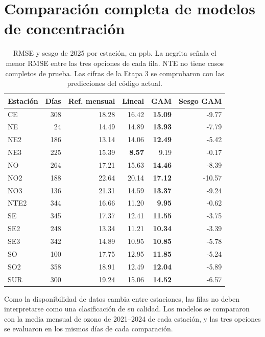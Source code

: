\documentclass[11pt,letterpaper]{article}
\begin{document}
\section{Comparación completa de modelos de concentración}\label{anexo:modelos}
\begin{table}[!htbp]\centering\small
\begin{tabular}{@{}lrrrrr@{}}
\toprule
Estación & Días & Ref. mensual & Lineal & GAM & Sesgo GAM \\
\midrule
CE & 308 & 18.28 & 16.42 & \textbf{15.09} & -9.77 \\
NE & 24 & 14.49 & 14.89 & \textbf{13.93} & -7.79 \\
NE2 & 186 & 13.14 & 14.06 & \textbf{12.49} & -5.42 \\
NE3 & 225 & 15.39 & \textbf{8.57} & 9.19 & -0.17 \\
NO & 264 & 17.21 & 15.63 & \textbf{14.46} & -8.39 \\
NO2 & 188 & 22.64 & 20.14 & \textbf{17.12} & -10.57 \\
NO3 & 136 & 21.31 & 14.59 & \textbf{13.37} & -9.24 \\
NTE2 & 344 & 16.66 & 11.20 & \textbf{9.95} & -0.62 \\
SE & 345 & 17.37 & 12.41 & \textbf{11.55} & -3.75 \\
SE2 & 248 & 13.34 & 11.21 & \textbf{10.34} & -3.39 \\
SE3 & 342 & 14.89 & 10.95 & \textbf{10.85} & -5.78 \\
SO & 100 & 17.75 & 12.95 & \textbf{11.85} & -5.24 \\
SO2 & 358 & 18.91 & 12.49 & \textbf{12.04} & -5.89 \\
SUR & 300 & 19.24 & 15.06 & \textbf{14.52} & -6.57 \\
\bottomrule
\end{tabular}
\caption{RMSE y sesgo de 2025 por estación, en ppb. La negrita señala el menor RMSE entre las tres opciones de cada fila. NTE no tiene casos completos de prueba. Las cifras de la Etapa 3 se comprobaron con las predicciones del código actual.}\label{tab:gamcompleto}
\end{table}
Como la disponibilidad de datos cambia entre estaciones, las filas no deben interpretarse como una clasificación de su calidad. Los modelos se compararon con la media mensual de ozono de 2021--2024 de cada estación, y las tres opciones se evaluaron en los mismos días de cada comparación.
\clearpage
\end{document}

